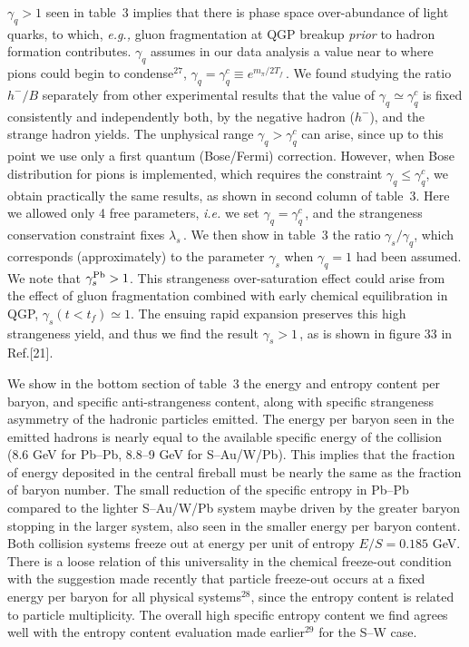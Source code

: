 \begin{mdframed}[linecolor=gray,roundcorner=12pt,backgroundcolor=Dandelion!15,linewidth=1pt,leftmargin=0cm,rightmargin=0cm,topline=true,bottomline=true,skipabove=12pt]
$\gamma_q>1$ seen in table~3 implies that there is phase space over-abundance of light quarks, to which, {\it e.g.,} gluon fragmentation at QGP breakup {\it prior} to hadron formation contributes. $\gamma_q$ assumes in our data analysis a value near to where pions could begin to condense$^{27}$, $\gamma_q=\gamma_q^c\equiv e^{m_\pi/2T_f}$\,. We found studying the ratio $h^-/B$ separately from other experimental results that the value of $\gamma_q\simeq\gamma_q^c$ is fixed consistently and independently both, by the negative hadron ($h^-$), and the strange hadron yields. The unphysical range $\gamma_q>\gamma_q^c$ can arise, since up to this point we use only a first quantum (Bose/Fermi) correction. However, when Bose distribution for pions is implemented, which requires the constraint $\gamma_q\le\gamma_q^c$, we obtain practically the same results, as shown in second column of table~3. Here we allowed only 4 free parameters, {\it i.e.} we set $\gamma_q=\gamma_q^c$\,, and the strangeness conservation constraint fixes $\lambda_s$\,. We then show in table~3 the ratio $\gamma_s/\gamma_q$, which corresponds (approximately) to the parameter $\gamma_s$ when $\gamma_q=1$ had been assumed. We note that $\gamma_s^{\rm Pb}>1$. This strangeness over-saturation effect could arise from the effect of gluon fragmentation combined with early chemical equilibration in QGP, $\gamma_s(t<t_f)\simeq 1$. The ensuing rapid expansion preserves this high strangeness yield, and thus we find the result $\gamma_s>1$\,, as is shown in figure 33 in Ref.[21].

We show in the bottom section of table~3 the energy and entropy content per baryon, and specific anti-strangeness content, along with specific strangeness asymmetry of the hadronic particles emitted. The energy per baryon seen in the emitted hadrons is nearly equal to the available specific energy of the collision (8.6 GeV for Pb--Pb, 8.8--9 GeV for S--Au/W/Pb). This implies that the fraction of energy deposited in the central fireball must be nearly the same as the fraction of baryon number. The small reduction of the specific entropy in Pb--Pb compared to the lighter S--Au/W/Pb system maybe driven by the greater baryon stopping in the larger system, also seen in the smaller energy per baryon content. Both collision systems freeze out at energy per unit of entropy $E/S=0.185$ GeV. There is a loose relation of this universality in the chemical freeze-out condition with the suggestion made recently that particle freeze-out occurs at a fixed energy per baryon for all physical systems$^{28}$, since the entropy content is related to particle multiplicity. The overall high specific entropy content we find agrees well with the entropy content evaluation made earlier$^{29}$ for the S--W case.


\end{mdframed}
